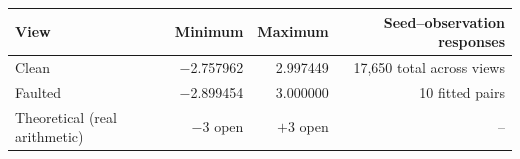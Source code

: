 \begin{tabular}{lrrr}
\toprule
View & Minimum & Maximum & Seed--observation responses \\
\midrule
Clean & $-$2.757962 & 2.997449 & 17,650 total across views \\
Faulted & $-$2.899454 & 3.000000 & 10 fitted pairs \\
Theoretical (real arithmetic) & $-3$ open & $+3$ open & -- \\
\bottomrule
\end{tabular}
